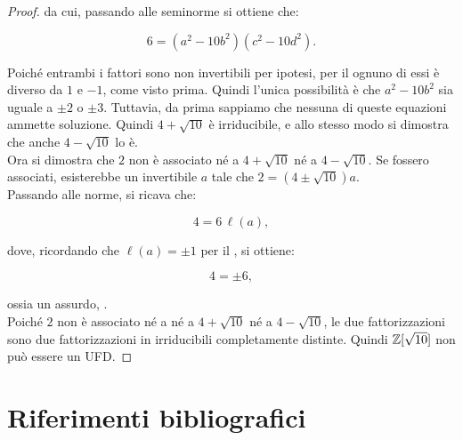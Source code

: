\documentclass[11pt]{scrbook}
\begin{document}
\begin{proof}
    \vskip 0.1in
    
    da cui, passando alle seminorme si ottiene che:
    
    \[ 6 = (a^2 - 10b^2)(c^2 - 10d^2). \]
    
    \vskip 0.1in
    
    Poiché entrambi i fattori sono non invertibili per ipotesi,
    per il  ognuno di essi è
    diverso da $1$ e $-1$, come visto prima. Quindi l'unica
    possibilità è che $a^2 - 10b^2$ sia uguale a $\pm 2$ o
    $\pm 3$. Tuttavia, da prima sappiamo che nessuna di queste
    equazioni ammette soluzione. Quindi $4+\sqrt{10}$ è irriducibile,
    e allo stesso modo si dimostra che anche $4-\sqrt{10}$ lo
    è. \\
    
    Ora si dimostra che $2$ non è associato né a $4 + \sqrt{10}$
    né a $4 - \sqrt{10}$. Se fossero associati, esisterebbe
    un invertibile $a$ tale che $2 = (4 \pm \sqrt{10})a$. \\
    
    Passando alle norme, si ricava che:
    
    \[ 4 = 6 \, \ell(a),  \]
    
    \vskip 0.1in
    
    dove, ricordando che $\ell(a)=\pm 1$ per il ,
    si ottiene:
    
    \[ 4 = \pm 6, \]
    
    \vskip 0.1in
    
    ossia un assurdo, \Lightning{}. \\
    
    Poiché $2$ non è associato né a né a $4 + \sqrt{10}$
    né a $4 - \sqrt{10}$, le due fattorizzazioni sono due
    fattorizzazioni in irriducibili completamente
    distinte. Quindi $\mathbb{Z}[\sqrt{10}]$ non può essere un UFD.
\end{proof}

\chapter{Riferimenti bibliografici}
\printbibliography[heading=none]
\end{document}
